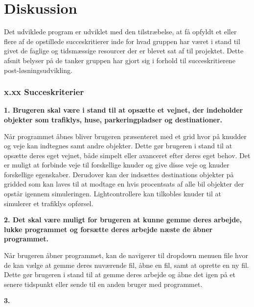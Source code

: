 \chapter{Diskussion}\label{Diskussion}
Det udviklede program er udviklet med den tilstræbelse, at få opfyldt et eller flere af de opstillede succeskritierer inde for hvad gruppen har været i stand til givet de faglige og tidsmæssige resourcer der er blevet sat af til projektet. Dette afsnit belyser på de tanker gruppen har gjort sig i forhold til succeskritierene post-løsningsudvikling.

\subsection{x.xx Succeskriterier}

\textbf{1. Brugeren skal være i stand til at opsætte et vejnet, der indeholder objekter som trafiklys, huse, parkeringpladser og destinationer.}

Når programmet åbnes bliver brugeren præsenteret med et grid hvor på knudder og veje kan indtegnes samt andre objekter. Dette gør brugeren i stand til at opsætte deres eget vejnet, både simpelt eller avanceret efter deres eget behov. Det er muligt at forbinde veje til forskellige knuder og give disse veje og knuder forskellige egenskaber. Derudover kan der indsættes destinations objekter på gridded som kan laves til at modtage en hvis procentsats af alle bil objekter der opstår igennem simuleringen. Lightcontrollere kan tilkobles knuder til at simulerer et trafiklys opførsel.

\textbf{2. Det skal være muligt for brugeren at kunne gemme deres arbejde, lukke programmet og forsætte deres arbejde næste de åbner programmet.}

Når brugeren åbner programmet, kan de navigerer til dropdown menuen file hvor de kan vælge at gemme deres nuværende fil, åbne en fil, samt at oprette en ny fil. Dette gør brugeren i stand til at gemme deres arbejde og åbne det igen på et senere tidspunkt eller sende til en anden bruger med programmet.

\textbf{3. }
